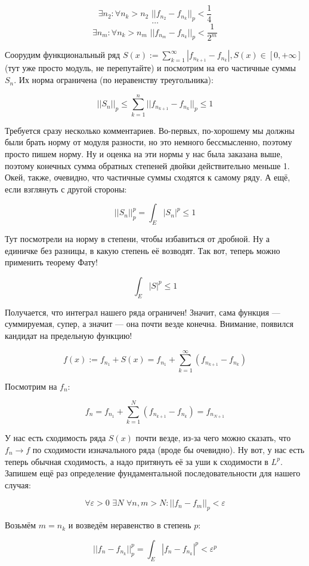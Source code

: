 \documentclass{article}
\def\dbl{\,\,}
\begin{document}
\[\exists n_2: \forall n_k > n_2 \dbl ||f_{n_2} - f_{n_k}||_p < \frac{1}{4}\]
\[\ldots\]
\[\exists n_m: \forall n_k > n_m \dbl ||f_{n_m} - f_{n_k}||_p < \frac{1}{2^m}\]

Соорудим функциональный ряд $S(x) := \sum_{k = 1}^{\infty} |f_{n_{k + 1}} - f_{n_k}|, S(x) \in [0, +\infty]$ (тут уже просто модуль, не перепутайте) и посмотрим на его частичные суммы $S_n$. Их норма ограничена (по неравенству треугольника):

\[||S_n||_p \le \sum_{k = 1}^{n} ||f_{n_{k + 1}} - f_{n_k}||_p \le 1\]

Требуется сразу несколько комментариев. Во-первых, по-хорошему мы должны были брать норму от модуля разности, но это немного бессмысленно, поэтому просто пишем норму. Ну и оценка на эти нормы у нас была заказана выше, поэтому конечных сумма обратных степеней двойки действительно меньше 1. Окей, также, очевидно, что частичные суммы сходятся к самому ряду. А ещё, если взглянуть с другой стороны:

\[||S_n||_p^p = \int_{E} |S_n|^p \le 1\]

Тут посмотрели на норму в степени, чтобы избавиться от дробной. Ну а единичке без разницы, в какую степень её возводят. Так вот, теперь можно применить теорему Фату!

\[\int_{E} |S|^p \le 1\]

Получается, что интеграл нашего ряда ограничен! Значит, сама функция --- суммируемая, супер, а значит --- она почти везде конечна. Внимание, появился кандидат на предельную функцию!

\[f(x) := f_{n_1} + S(x) = f_{n_1} + \sum_{k = 1}^{\infty} (f_{n_{k + 1}} - f_{n_k})\]

Посмотрим на $f_n$:

\[f_{n} = f_{n_1} + \sum_{k = 1}^{N} (f_{n_{k + 1}} - f_{n_k}) = f_{n_{N + 1}}\]

У нас есть сходимость ряда $S(x)$ почти везде, из-за чего можно сказать, что $f_n \rightarrow f$ по сходимости изначального ряда (вроде бы очевидно). Ну вот, у нас есть теперь обычная сходимость, а надо притянуть её за уши к сходимости в $L^p$. Запишем ещё раз определение фундаментальной последовательности для нашего случая:

\[\forall \varepsilon > 0 \dbl \exists N \dbl \forall n, m > N: ||f_n - f_m||_p < \varepsilon\]

Возьмём $m = n_k$ и возведём неравенство в степень $p$:

\[||f_n - f_{n_k}||_p^p = \int_{E} |f_n - f_{n_k}|^p < \varepsilon^p\]
\end{document}
